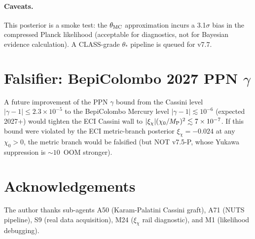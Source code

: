 \documentclass[aps,prl,twocolumn,showpacs,superscriptaddress]{revtex4-2}
\newcommand{\MP}{M_{\rm P}}
\begin{document}
\paragraph{Caveats.}
This posterior is a smoke test: the $\theta_{\rm MC}$
approximation incurs a 3.1$\sigma$ bias in the compressed
Planck likelihood (acceptable for diagnostics, not for
Bayesian evidence calculation).  A CLASS-grade $\theta_*$
pipeline is queued for v7.7.

\section*{Falsifier: BepiColombo 2027 PPN $\gamma$}

A future improvement of the PPN $\gamma$ bound from the Cassini
level $|\gamma-1| \le 2.3\times 10^{-5}$ to the BepiColombo
Mercury level $|\gamma-1| \lesssim 10^{-6}$ (expected 2027+)
would tighten the ECI Cassini wall to
$|\xi_\chi|(\chi_0/\MP)^2 \lesssim 7\times 10^{-7}$.  If this
bound were violated by the ECI metric-branch posterior
$\xi_\chi = -0.024$ at any $\chi_0 > 0$, the metric
branch would be falsified (but NOT v7.5-P, whose Yukawa
suppression is $\sim 10$~OOM stronger).

\section*{Acknowledgements}

The author thanks sub-agents A50 (Karam-Palatini Cassini graft),
A71 (NUTS pipeline), S9 (real data acquisition), M24
($\xi_\chi$ rail diagnostic), and M1 (likelihood debugging).
\end{document}
